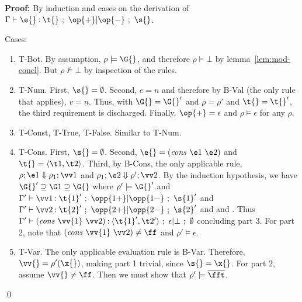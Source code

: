 \documentclass{article}[12pt]
\begin{document}
\noindent
{\bf Proof:}
By induction and cases on the derivation of
$\hastyeff{\e{}}{\t{}}{\op{+}}{\op{-}}{\s{}}$.

\noindent
Cases:
\begin{enumerate}
\item {\sc T-Bot}.  By assumption, $\rho \models \G{}$, and therefore
  $\rho \models \bot$ by lemma~\ref{lem:mod-concl}.  But $\rho \not\models
\bot$ by inspection of the rules.  
\item {\sc T-Num}.  First, $\s{} = \noeffect$.  Second, $e = n$ and
  therefore by {\sc B-Val} (the only rule that applies), $v = n$.
  Thus, with $\G{} = \G{}'$ and $\rho = \rho'$ and $\t{} = \t{}'$, the
  third requirement is discharged.  Finally, $\op{+} = \epsilon$ and
  $\rho \models \epsilon$ for any $\rho$.
\item {\sc T-Const, T-True, T-False}. Similar to {\sc T-Num}.
\item {\sc T-Cons}. First, $\s{} = \noeffect$.  Second, $\e{} =
  \cons{\e1}{\e2}$ and $\t{} = \consty{\t1}{\t2}$.  Third, by {\sc
    B-Cons}, the only applicable rule, $\evaltwo{\rho}{\e1}{\rho_1}{\vv1}$ and
  $\evaltwo{\rho_1}{\e2}{\rho'}{\vv2}$.  By the induction hypothesis,
  we have $\G{}' \supseteq \G1 \supseteq \G{}$ where $\rho' \models
  \G{}'$ and
  $\hastyeff[\Gamma']{\vv1}{\t{1}'}{\opp{1+}}{\opp{1-}}{\s{1}'}$  and
  $\hastyeff[\Gamma']{\vv2}{\t{2}'}{\opp{2+}}{\opp{2-}}{\s{2}'}$ and
   and .
  Thus
  $\hastyeff[\Gamma']{\cons{\vv{1}}{\vv2}}{\consty{\t{1}'}{\t2'}}{\epsilon}{\bot}{\noeffect}$
  concluding part 3.  For part 2, note that $\cons{\vv{1}}{\vv2} \neq
  \ff$ and $\rho' \models \epsilon$.
\item {\sc T-Var}.  The only applicable evaluation rule is {\sc
    B-Var}.  Therefore, $\vv{} = \rho'(\x{})$, making part 1 trivial,
  since $\s{} = \x{}$. For part 2, assume $\vv{} \neq \ff$.  Then we
  must show that $\rho' \models \comp{\fft}$.  
\end{enumerate}
\qed 
\end{document}
